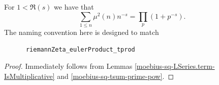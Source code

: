 \begin{theorem}
\label{moebius_sq_LSeries_eulerProduct_tprod}
\leanok
For $1<\Re(s)$ we have that
    $$\sum_{1\leq n}\mu^2(n)n^{-s}=\prod_p(1+p^{-s}).$$
    The naming convention here is designed to match
    \begin{verbatim}
      riemannZeta_eulerProduct_tprod
    \end{verbatim}
\end{theorem}
\begin{proof}
\leanok
Immediately follows from Lemmas \ref{moebius-sq-LSeries.term-IsMultiplicative} and \ref{moebius-sq-tsum-prime-pow}.
\end{proof}
